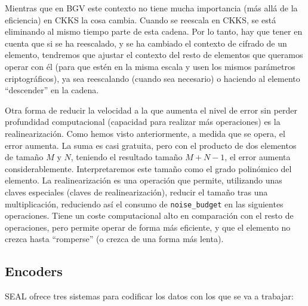 Mientras que en BGV este contexto no tiene mucha importancia (más allá de la eficiencia) en CKKS la cosa cambia. Cuando se reescala en CKKS, se está eliminando al mismo tiempo parte de esta cadena. Por lo tanto, hay que tener en cuenta que si se ha reescalado, y se ha cambiado el contexto de cifrado de un elemento, tendremos que ajustar el contexto del resto de elementos que queramos operar con él (para que estén en la misma escala y usen los mismos parámetros criptográficos), ya sea reescalando (cuando sea necesario) o haciendo al elemento ``descender'' en la cadena.

Otra forma de reducir la velocidad a la que aumenta el nivel de error sin perder profundidad computacional (capacidad para realizar más operaciones) es la realinearización. Como hemos visto anteriormente, a medida que se opera, el error aumenta. La suma es casi gratuita, pero con el producto de dos elementos de tamaño $M$ y $N$, teniendo el resultado tamaño $M+N-1$, el error aumenta considerablemente. Interpretaremos este tamaño como el grado polinómico del elemento. La realinearización es una operación que permite, utilizando unas claves especiales (claves de realinearización), reducir el tamaño tras una multiplicación, reduciendo así el consumo de \verb|noise_budget| en las siguientes operaciones. Tiene un coste computacional alto en comparación con el resto de operaciones, pero permite operar de forma más eficiente, y que el elemento no crezca hasta ``romperse'' (o crezca de una forma más lenta).

\subsection{Encoders}

SEAL ofrece tres sistemas para codificar los datos con los que se va a trabajar:

